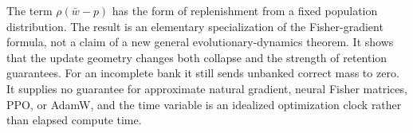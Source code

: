 The term $\rho(\bar w-p)$ has the form of replenishment from a fixed
population distribution. The result is an elementary specialization of the
Fisher-gradient formula, not a claim of a new general evolutionary-dynamics
theorem. It shows that the update geometry changes both collapse and the
strength of retention guarantees. For an incomplete bank it still sends
unbanked correct mass to zero. It supplies no guarantee for approximate
natural gradient, neural Fisher matrices, PPO, or AdamW, and the time variable
is an idealized optimization clock rather than elapsed compute time.
